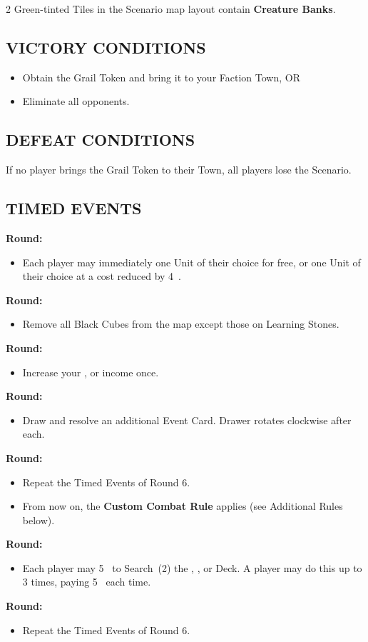 \begin{multicols}{2}
Green-tinted Tiles in the Scenario map layout contain \textbf{Creature Banks}.

\subsection*{\MakeUppercase{Victory Conditions}}
\begin{itemize}
  \item Obtain the Grail Token and bring it to your Faction Town, OR
  \item Eliminate all opponents.
\end{itemize}

\subsection*{\MakeUppercase{Defeat Conditions}}
If no player brings the Grail Token to their Town, all players lose the Scenario.

\subsection*{\MakeUppercase{Timed Events}}
\textbf{ Round:}
\begin{itemize}
  \item Each player may immediately  one  Unit of their choice for free, or one  Unit of their choice at a cost reduced by 4~.
\end{itemize}
\textbf{ Round:}
\begin{itemize}
  \item Remove all Black Cubes from the map except those on Learning Stones.
\end{itemize}
\textbf{ Round:}
\begin{itemize}
  \item Increase your ,  or  income once.
\end{itemize}
\textbf{ Round:}
\begin{itemize}
  \item Draw and resolve an additional Event Card.
    Drawer rotates clockwise after each.
\end{itemize}
\textbf{ Round:}
\begin{itemize}
  \item Repeat the Timed Events of Round 6.
  \item From now on, the \textbf{Custom Combat Rule} applies (see Additional Rules below).
\end{itemize}
\textbf{ Round:}
\begin{itemize}
  \item Each player may  5~ to Search~(2) the , , or  Deck.
    A player may do this up to 3 times, paying 5~ each time.
\end{itemize}
\textbf{ Round:}
\begin{itemize}
  \item Repeat the Timed Events of Round 6.
\end{itemize}

\end{multicols}
